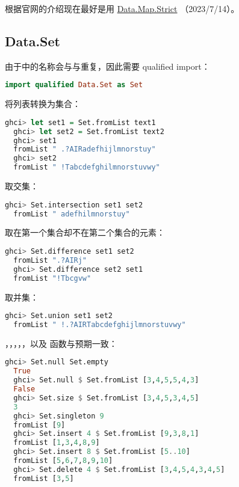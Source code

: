 \documentclass[./main.tex]{subfiles}
\begin{document}
根据官网的介绍现在最好是用
\href{https://downloads.haskell.org/ghc/latest/docs/libraries/containers-0.6.7/Data-Map.html}{Data.Map.Strict}
（2023/7/14）。

\subsection*{Data.Set}

由于中的名称会与与重复，因此需要 qualified import：

\begin{lstlisting}[language=Haskell]
  import qualified Data.Set as Set
\end{lstlisting}

将列表转换为集合：

\begin{lstlisting}[language=Haskell]
  ghci> let set1 = Set.fromList text1
  ghci> let set2 = Set.fromList text2
  ghci> set1
  fromList " .?AIRadefhijlmnorstuy"
  ghci> set2
  fromList " !Tabcdefghilmnorstuvwy"
\end{lstlisting}

取交集：

\begin{lstlisting}[language=Haskell]
  ghci> Set.intersection set1 set2
  fromList " adefhilmnorstuy"
\end{lstlisting}

取在第一个集合却不在第二个集合的元素：

\begin{lstlisting}[language=Haskell]
  ghci> Set.difference set1 set2
  fromList ".?AIRj"
  ghci> Set.difference set2 set1
  fromList "!Tbcgvw"
\end{lstlisting}

取并集：

\begin{lstlisting}[language=Haskell]
  ghci> Set.union set1 set2
  fromList " !.?AIRTabcdefghijlmnorstuvwy"
\end{lstlisting}

，，，，，以及
函数与预期一致：

\begin{lstlisting}[language=Haskell]
  ghci> Set.null Set.empty
  True
  ghci> Set.null $ Set.fromList [3,4,5,5,4,3]
  False
  ghci> Set.size $ Set.fromList [3,4,5,3,4,5]
  3
  ghci> Set.singleton 9
  fromList [9]
  ghci> Set.insert 4 $ Set.fromList [9,3,8,1]
  fromList [1,3,4,8,9]
  ghci> Set.insert 8 $ Set.fromList [5..10]
  fromList [5,6,7,8,9,10]
  ghci> Set.delete 4 $ Set.fromList [3,4,5,4,3,4,5]
  fromList [3,5]
\end{lstlisting}
\end{document}
